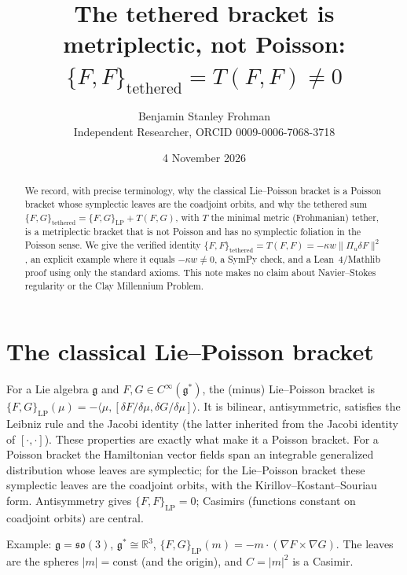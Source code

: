 \documentclass[11pt]{article}
\title{The tethered bracket is metriplectic, not Poisson:\\ $\{F,F\}_{\mathrm{tethered}}=T(F,F)\neq 0$}
\author{Benjamin Stanley Frohman\\ Independent Researcher, ORCID 0009-0006-7068-3718}
\date{4 November 2026}
\begin{document}
\maketitle
\begin{abstract}
We record, with precise terminology, why the classical Lie--Poisson bracket is a Poisson bracket whose symplectic leaves are the coadjoint orbits, and why the tethered sum $\{F,G\}_{\mathrm{tethered}}=\{F,G\}_{\mathrm{LP}}+T(F,G)$, with $T$ the minimal metric (Frohmanian) tether, is a metriplectic bracket that is not Poisson and has no symplectic foliation in the Poisson sense. We give the verified identity $\{F,F\}_{\mathrm{tethered}}=T(F,F)=-\kappa w\|\Pi_u\delta F\|^2$, an explicit example where it equals $-\kappa w\neq 0$, a SymPy check, and a Lean~4/Mathlib proof using only the standard axioms. This note makes no claim about Navier--Stokes regularity or the Clay Millennium Problem.
\end{abstract}

\section{The classical Lie--Poisson bracket}
For a Lie algebra $\mathfrak g$ and $F,G\in C^\infty(\mathfrak g^*)$, the (minus) Lie--Poisson bracket is
$\{F,G\}_{\mathrm{LP}}(\mu)=-\langle\mu,[\delta F/\delta\mu,\delta G/\delta\mu]\rangle$.
It is bilinear, antisymmetric, satisfies the Leibniz rule and the Jacobi identity (the latter inherited from the Jacobi identity of $[\cdot,\cdot]$). These properties are exactly what make it a Poisson bracket. For a Poisson bracket the Hamiltonian vector fields span an integrable generalized distribution whose leaves are symplectic; for the Lie--Poisson bracket these symplectic leaves are the coadjoint orbits, with the Kirillov--Kostant--Souriau form. Antisymmetry gives $\{F,F\}_{\mathrm{LP}}=0$; Casimirs (functions constant on coadjoint orbits) are central.

Example: $\mathfrak g=\mathfrak{so}(3)$, $\mathfrak g^*\cong\mathbb R^3$, $\{F,G\}_{\mathrm{LP}}(m)=-m\cdot(\nabla F\times\nabla G)$. The leaves are the spheres $|m|=\text{const}$ (and the origin), and $C=|m|^2$ is a Casimir.
\end{document}
